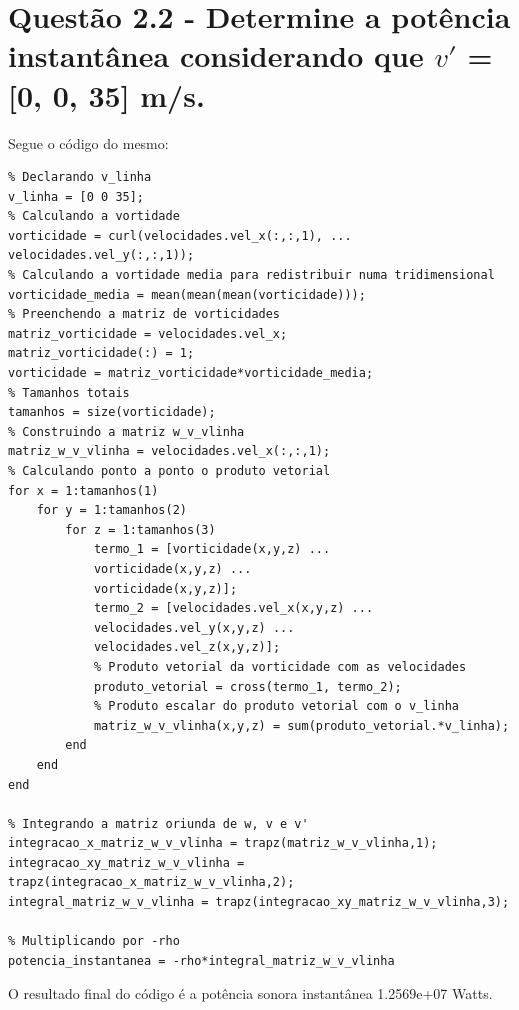  \section{Questão 2.2 - Determine a potência instantânea considerando que $v'$ = [0, 0, 35] m/s.}

 Segue o código do mesmo:
 \begin{lstlisting}
% Declarando v_linha
v_linha = [0 0 35];
% Calculando a vortidade
vorticidade = curl(velocidades.vel_x(:,:,1), ...
velocidades.vel_y(:,:,1));
% Calculando a vortidade media para redistribuir numa tridimensional
vorticidade_media = mean(mean(mean(vorticidade)));
% Preenchendo a matriz de vorticidades
matriz_vorticidade = velocidades.vel_x;
matriz_vorticidade(:) = 1;
vorticidade = matriz_vorticidade*vorticidade_media;
% Tamanhos totais
tamanhos = size(vorticidade);
% Construindo a matriz w_v_vlinha
matriz_w_v_vlinha = velocidades.vel_x(:,:,1);
% Calculando ponto a ponto o produto vetorial
for x = 1:tamanhos(1)
	for y = 1:tamanhos(2)
		for z = 1:tamanhos(3)
			termo_1 = [vorticidade(x,y,z) ...
			vorticidade(x,y,z) ... 
			vorticidade(x,y,z)];
			termo_2 = [velocidades.vel_x(x,y,z) ...
			velocidades.vel_y(x,y,z) ...
			velocidades.vel_z(x,y,z)];
			% Produto vetorial da vorticidade com as velocidades
			produto_vetorial = cross(termo_1, termo_2);
			% Produto escalar do produto vetorial com o v_linha
			matriz_w_v_vlinha(x,y,z) = sum(produto_vetorial.*v_linha);
		end
	end
end

% Integrando a matriz oriunda de w, v e v'
integracao_x_matriz_w_v_vlinha = trapz(matriz_w_v_vlinha,1);
integracao_xy_matriz_w_v_vlinha = trapz(integracao_x_matriz_w_v_vlinha,2);
integral_matriz_w_v_vlinha = trapz(integracao_xy_matriz_w_v_vlinha,3);

% Multiplicando por -rho
potencia_instantanea = -rho*integral_matriz_w_v_vlinha
\end{lstlisting}

O resultado final do código é a potência sonora instantânea 1.2569e+07 Watts.

   